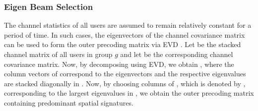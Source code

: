 \documentclass[letterpaper,conference,10pt]{IEEEtran}
\begin{document}
	\subsubsection{Eigen Beam Selection}	
	The channel statistics of all users are assumed to remain relatively constant for a period of time. In such cases, the eigenvectors of the channel covariance matrix can be used to form the outer precoding matrix via \ac{EVD} \cite{adhikary2013joint,arvola2016two}. Let  be the stacked channel matrix of all users in group $g$ and let  be the corresponding channel covariance matrix. Now, by decomposing  using \ac{EVD}, we obtain , where the column vectors of  correspond to the eigenvectors and the respective eigenvalues are stacked diagonally in . Now, by choosing  columns of , which is denoted by , corresponding to the  largest eigenvalues in , we obtain the outer precoding matrix  containing  predominant spatial signatures.	
\end{document}
